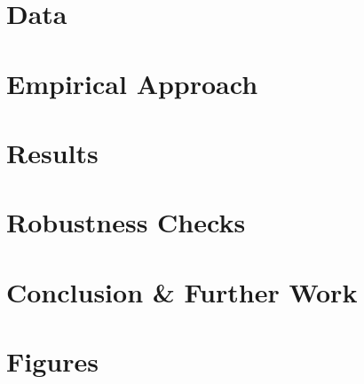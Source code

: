 \documentclass[11pt, oneside]{article}
\begin{document}
	\section{Data}
	
	\label{data}
	
	\section{Empirical Approach}
	
	\label{empirical}
	
	\section{Results}
	
	\label{results}
	
	\section{Robustness Checks}
	
	\label{robustness}
	
	\section{Conclusion \& Further Work}
	
	\label{conclusion}
	\newpage
	
	
	
	
	\newpage
	
	\section*{Figures}
	\label{figures}
	
	\newpage
	
\end{document}

